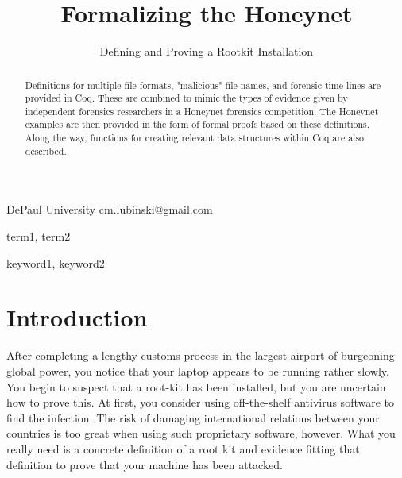 \documentclass[nocopyrightspace]{sigplanconf}
\begin{document}
\lstset{language=coq, basicstyle=\ttfamily\scriptsize, columns=flexible,
keepspaces=true}

\setlength{\pdfpageheight}{\paperheight}
\setlength{\pdfpagewidth}{\paperwidth}



\title{Formalizing the Honeynet}
\subtitle{Defining and Proving a Rootkit Installation}

           {DePaul University}
           {cm.lubinski@gmail.com}

\maketitle

\begin{abstract}
Definitions for multiple file formats, "malicious" file names, and forensic
time lines are provided in Coq. These are combined to mimic the types of
evidence given by independent forensics researchers in a Honeynet forensics
competition. The Honeynet examples are then provided in the form of formal
proofs based on these definitions. Along the way, functions for creating
relevant data structures within Coq are also described.
\end{abstract}


\terms
term1, term2

\keywords
keyword1, keyword2

\section{Introduction}

After completing a lengthy customs process in the largest airport of
burgeoning global power, you notice that your laptop appears to be running
rather slowly. You begin to suspect that a root-kit has been installed, but
you are uncertain how to prove this. At first, you consider using
off-the-shelf antivirus software to find the infection. The risk of damaging
international relations between your countries is too great when using such
proprietary software, however. What you really need is a concrete definition
of a root kit and evidence fitting that definition to prove that your machine
has been attacked.
\end{document}

